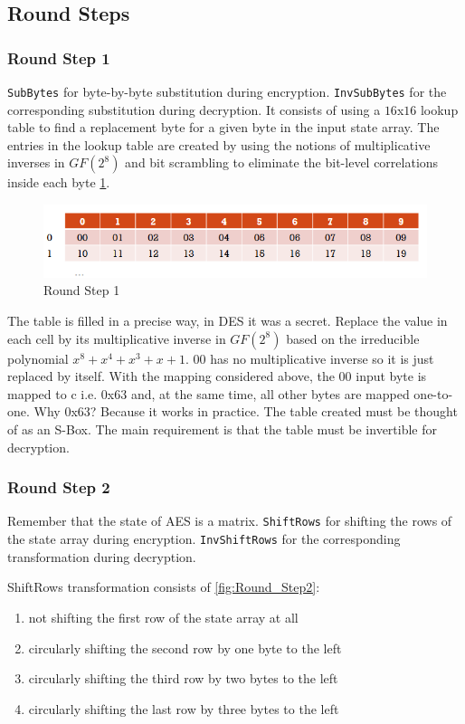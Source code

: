 \subsection{Round Steps}

\subsubsection{Round Step 1}

\texttt{SubBytes} for byte-by-byte substitution during encryption. \texttt{InvSubBytes} for the corresponding substitution during decryption. It consists of using a $16$x$16$ lookup table to find a replacement byte for a given byte in the input state array. The entries in the lookup table are created by using the notions of multiplicative inverses in $GF(2^8)$ and bit scrambling to eliminate the bit-level correlations inside each byte \ref{fig:LookupTable}.

\begin{figure}
	\centering
	\includegraphics[width=0.7\linewidth]{Images/Chapter3/LookupTable}
	\caption{Round Step 1}
	\label{fig:LookupTable}
\end{figure}

The table is filled in a precise way, in DES it was a secret. Replace the value in each cell by its multiplicative inverse in $GF(2^8)$ based on the irreducible polynomial $x^8 + x^4 + x^3 + x + 1$. 00 has no multiplicative inverse so it is just replaced by itself. With the mapping considered above, the 00 input byte is mapped to c i.e. 0x63 and, at the same time, all other bytes are mapped one-to-one. Why 0x63? Because it works in practice. The table created must be thought of as an S-Box. The main requirement is that the table must be invertible for decryption.

\subsubsection{Round Step 2}

Remember that the state of AES is a matrix. \texttt{ShiftRows} for shifting the rows of the state array during encryption. \texttt{InvShiftRows} for the corresponding transformation during decryption. 

ShiftRows transformation consists of \ref{fig:Round_Step2}: 
\begin{enumerate}
	\item not shifting the first row of the state array at all
	\item circularly shifting the second row by one byte to the left
	\item circularly shifting the third row by two bytes to the left
	\item circularly shifting the last row by three bytes to the left
\end{enumerate}

